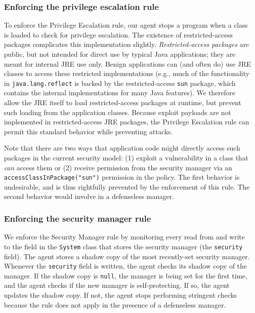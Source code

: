 \documentclass{sig-alternate}
\begin{document}
\subsubsection{Enforcing the privilege escalation rule}\label{sub:Enforcing-the-Privilege}


To enforce the Privilege Escalation rule, our agent stops a program when a 
class is loaded to check for privilege escalation.
The existence of restricted-access packages complicates this implementation slightly. 
\textit{Restricted-access packages} are public, but not intended for direct
use by typical Java applications; they are meant for internal JRE
use only. 
%
Benign applications can (and often do) use JRE classes to access these
restricted implementations (e.g., much of the functionality in \texttt{java.lang.reflect}
is backed by the restricted-access \texttt{sun} package, which
contains the internal implementations
for many Java features).  We therefore allow the JRE itself to load restricted-access packages
at runtime, but prevent such loading from the application classes.
Because exploit payloads are not implemented in restricted-access JRE packages,
the Privilege Escalation rule can permit this standard behavior while preventing
attacks.  

Note that there are two ways that application code might directly access such
packages in the current security model: 
(1) exploit a vulnerability in a class that \emph{can} access them or (2)
receive permission from the security manager via an
\texttt{accessClassInPackage("sun")} permission in the policy.  The first behavior
is undesirable, and is thus rightfully prevented by the enforcement of this
rule.  The second behavior would involve in a defenseless manager. 


\subsubsection{Enforcing the security manager rule}\label{sub:Enforcing-the-SecurityManager}

We enforce the Security Manager rule by monitoring every read from
and write to the field in the \texttt{System} class that stores the security
manager (the \texttt{security} field).
%
The agent stores a shadow copy of the most recently-set security
manager.
Whenever the \texttt{security} field is written, the agent checks its
shadow copy of the manager.  If the shadow copy is \texttt{null},
the manager is being set for the first time, and the agent checks
if the new manager is self-protecting. If so, 
the agent updates the shadow copy. If not, the agent stops performing stringent
checks because the rule does not apply in the presence of a defenseless 
manager.
\end{document}
